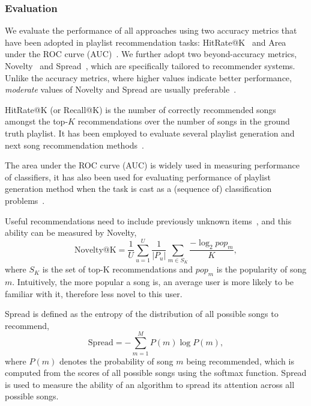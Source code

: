 \subsubsection{Evaluation}
We evaluate the performance of all approaches using two accuracy metrics that have been adopted 
in playlist recommendation tasks:
HitRate@K~\cite{hariri2012context} and Area under the ROC curve (AUC)~\cite{manning2008introIR}.
We further adopt two beyond-accuracy metrics, \ie
Novelty~\cite{zhang2012auralist,schedl2017} and Spread~\cite{kluver2014evaluating},
which are specifically tailored to recommender systems.
Unlike the accuracy metrics, where higher values indicate better performance,
\emph{moderate} values of Novelty and Spread are usually preferable~\cite{kluver2014evaluating,schedl2017}.
%

HitRate@K (or Recall@K) is the number of correctly recommended songs amongst the top-$K$ recommendations over
the number of songs in the ground truth playlist. %
It has been employed to evaluate several playlist generation and next song recommendation
methods~\cite{hariri2012context,bonnin2013evaluating,bonnin2015automated,jannach2015beyond}.

The area under the ROC curve (AUC) is widely used in measuring performance of classifiers,
it has also been used for evaluating performance of playlist generation method when the task
is cast as a (sequence of) classification problems~\cite{ben2017groove}.

Useful recommendations need to include previously unknown items~\cite{herlocker2004evaluating,zhang2012auralist}, 
and this ability can be measured by Novelty,
$$
\text{Novelty@K} = \frac{1}{U} \sum_{u=1}^U \frac{1}{|P_u|} \sum_{m \in S_K} \frac{-\log_2 pop_m}{K},
$$
where $S_K$ is the set of top-K recommendations and $pop_m$ is the popularity of song $m$.
Intuitively, the more popular a song is, an average user is more likely to be familiar with it,
therefore less novel to this user.

Spread is defined as the entropy of the distribution of all possible songs to recommend,
$$
\text{Spread} = -\sum_{m=1}^M P(m) \log P(m),
$$
where $P(m)$ denotes the probability of song $m$ being recommended,
which is computed from the scores of all possible songs using the softmax function.
Spread is used to measure the ability of an algorithm to spread its attention across all possible songs.



